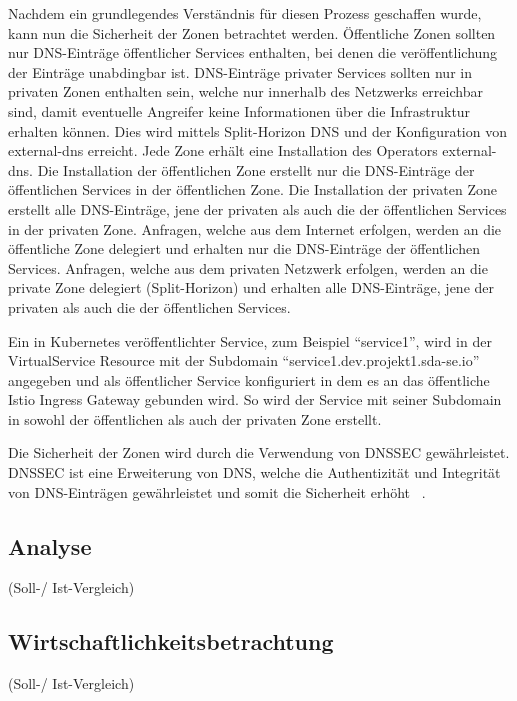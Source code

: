 Nachdem ein grundlegendes Verständnis für diesen Prozess geschaffen wurde, kann nun die Sicherheit der Zonen betrachtet werden.
Öffentliche Zonen sollten nur DNS-Einträge öffentlicher Services enthalten, bei denen die veröffentlichung der Einträge unabdingbar ist.
DNS-Einträge privater Services sollten nur in privaten Zonen enthalten sein, welche nur innerhalb des Netzwerks erreichbar sind, damit eventuelle Angreifer
keine Informationen über die Infrastruktur erhalten können.
Dies wird mittels Split-Horizon DNS und der Konfiguration von external-dns erreicht.
Jede Zone erhält eine Installation des Operators external-dns.
Die Installation der öffentlichen Zone erstellt nur die DNS-Einträge der öffentlichen Services in der öffentlichen Zone.
Die Installation der privaten Zone erstellt alle DNS-Einträge, jene der privaten als auch die der öffentlichen Services in der privaten Zone.
Anfragen, welche aus dem Internet erfolgen, werden an die öffentliche Zone delegiert und erhalten nur die DNS-Einträge der öffentlichen Services.
Anfragen, welche aus dem privaten Netzwerk erfolgen, werden an die private Zone delegiert (Split-Horizon) und erhalten alle DNS-Einträge, jene der privaten als auch die der öffentlichen Services.
\medskip

Ein in Kubernetes veröffentlichter Service, zum Beispiel \enquote{service1}, wird in der VirtualService Resource mit der Subdomain \enquote{service1.dev.projekt1.sda-se.io} angegeben und als öffentlicher Service konfiguriert in dem es an das öffentliche Istio Ingress Gateway gebunden wird.
So wird der Service mit seiner Subdomain in sowohl der öffentlichen als auch der privaten Zone erstellt.
\medskip

Die Sicherheit der Zonen wird durch die Verwendung von \ac{DNSSEC} gewährleistet.
DNSSEC ist eine Erweiterung von DNS, welche die Authentizität und Integrität von DNS-Einträgen gewährleistet und somit die Sicherheit erhöht ~\cite{kelm2001sicherheit}.


\subsection{Analyse}
\label{subsec:description:analyse}
(Soll-/ Ist-Vergleich)

\subsection{Wirtschaftlichkeitsbetrachtung}
\label{subsec:description:ergebnisse:wirtschaftlichkeitsbetrachtung}
(Soll-/ Ist-Vergleich)

